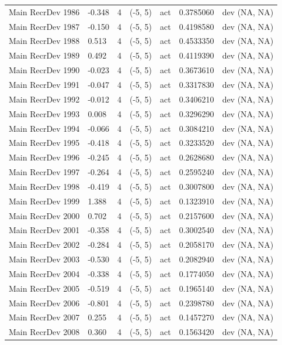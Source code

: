 \documentclass[11pt,
  english,
  a4paper,
]{article}
\begin{document}
\begin{landscape}
\begin{longtable}[t]{>{\raggedright\arraybackslash}p{8.5cm}lllll>{\raggedright\arraybackslash}p{4cm}}
Main RecrDev 1986 & -0.348 & 4 & (-5, 5) & act & 0.3785060 & dev (NA, NA)\\
Main RecrDev 1987 & -0.150 & 4 & (-5, 5) & act & 0.4198580 & dev (NA, NA)\\
Main RecrDev 1988 & 0.513 & 4 & (-5, 5) & act & 0.4533350 & dev (NA, NA)\\
Main RecrDev 1989 & 0.492 & 4 & (-5, 5) & act & 0.4119390 & dev (NA, NA)\\
Main RecrDev 1990 & -0.023 & 4 & (-5, 5) & act & 0.3673610 & dev (NA, NA)\\
Main RecrDev 1991 & -0.047 & 4 & (-5, 5) & act & 0.3317830 & dev (NA, NA)\\
Main RecrDev 1992 & -0.012 & 4 & (-5, 5) & act & 0.3406210 & dev (NA, NA)\\
Main RecrDev 1993 & 0.008 & 4 & (-5, 5) & act & 0.3296290 & dev (NA, NA)\\
Main RecrDev 1994 & -0.066 & 4 & (-5, 5) & act & 0.3084210 & dev (NA, NA)\\
Main RecrDev 1995 & -0.418 & 4 & (-5, 5) & act & 0.3233520 & dev (NA, NA)\\
Main RecrDev 1996 & -0.245 & 4 & (-5, 5) & act & 0.2628680 & dev (NA, NA)\\
Main RecrDev 1997 & -0.264 & 4 & (-5, 5) & act & 0.2595240 & dev (NA, NA)\\
Main RecrDev 1998 & -0.419 & 4 & (-5, 5) & act & 0.3007800 & dev (NA, NA)\\
Main RecrDev 1999 & 1.388 & 4 & (-5, 5) & act & 0.1323910 & dev (NA, NA)\\
Main RecrDev 2000 & 0.702 & 4 & (-5, 5) & act & 0.2157600 & dev (NA, NA)\\
Main RecrDev 2001 & -0.358 & 4 & (-5, 5) & act & 0.3002540 & dev (NA, NA)\\
Main RecrDev 2002 & -0.284 & 4 & (-5, 5) & act & 0.2058170 & dev (NA, NA)\\
Main RecrDev 2003 & -0.530 & 4 & (-5, 5) & act & 0.2082940 & dev (NA, NA)\\
Main RecrDev 2004 & -0.338 & 4 & (-5, 5) & act & 0.1774050 & dev (NA, NA)\\
Main RecrDev 2005 & -0.519 & 4 & (-5, 5) & act & 0.1965140 & dev (NA, NA)\\
Main RecrDev 2006 & -0.801 & 4 & (-5, 5) & act & 0.2398780 & dev (NA, NA)\\
Main RecrDev 2007 & 0.255 & 4 & (-5, 5) & act & 0.1457270 & dev (NA, NA)\\
Main RecrDev 2008 & 0.360 & 4 & (-5, 5) & act & 0.1563420 & dev (NA, NA)\\

\end{longtable}
\end{landscape}
\end{document}
